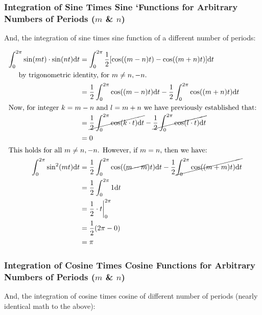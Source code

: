 \documentclass[10pt]{article} %
\begin{document}
\subsubsection{Integration of Sine Times Sine `Functions for Arbitrary Numbers of Periods ($m$ \& $n$)}


And, the integration of sine times sine function of a different number of periods:

\begin{align*}
    \int_0^{2\pi} \sin(mt) \cdot \sin(nt) \mathrm{d}t &= \int_0^{2\pi}\frac12[\cos((m-n)t) - \cos((m+n)t)]\mathrm{d}t \\
    \intertext{\hspace{0.5cm}by trigonometric identity, for $m \neq n, -n$.}
    & =\frac12\int_0^{2\pi}\cos((m-n)t)\mathrm{d}t - \frac12\int_0^{2\pi}\cos((m+n)t)\mathrm{d}t\\
    \intertext{Now, for integer $k=m-n$ and $l=m+n$ we have previously established that:}
    & =\cancel{\frac12\int_0^{2\pi}\cos(k \cdot t)\mathrm{d}t} - \cancel{\frac12\int_0^{2\pi}\cos(l \cdot t)\mathrm{d}t}\\
    & = 0 \\
    \intertext{This holds for all $m \neq n, -n$. However, if $m = n$, then we have:}
    \int_0^{2\pi} \sin^2(mt)\mathrm{d}t & = \frac12\int_0^{2\pi}\cos((\cancel{m-m})t)\mathrm{d}t - \frac12\cancel{\int_0^{2\pi}\cos((m+m)t)\mathrm{d}t}\\
    & = \frac12\int_0^{2\pi}1\mathrm{d}t\\
    & = \frac12 \cdot t \bigg\rvert_0^{2\pi} \\
    & = \frac12 (2\pi - 0) \\
    & = \pi
\end{align*}

\subsubsection{Integration of Cosine Times Cosine Functions for Arbitrary Numbers of Periods ($m$ \& $n$)}


And, the integration of cosine times cosine of different number of periods (nearly identical math to the above):
\end{document}
